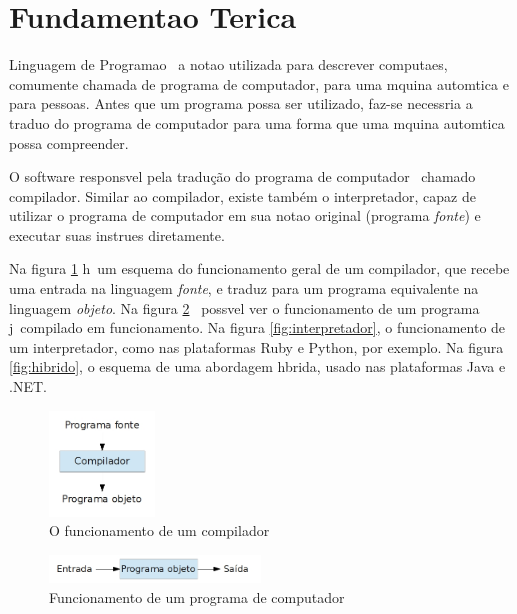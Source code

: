 \section{Fundamenta\ca o Te\oh rica}

\label{pro:fundamentacao}

Linguagem de Programa\ca o \eh\ a nota\ca o utilizada para descrever computa\co es, comumente chamada de programa de computador, para uma m\ah quina autom\ah tica e para pessoas. Antes que um programa possa ser utilizado, faz-se necess\ah ria a tradu\ca o do programa de computador para uma forma que uma m\ah quina autom\ah tica possa compreender.

O software respons\ah vel pela tradução do programa de computador \eh\ chamado compilador. Similar ao compilador, existe também o interpretador, capaz de utilizar o programa de computador em sua nota\ca o original (programa \emph{fonte}) e executar suas instru\co es diretamente.

Na figura \ref{fig:compilador} h\ah\ um esquema do funcionamento geral de um compilador, que recebe uma entrada na linguagem \emph{fonte}, e traduz para um programa equivalente na linguagem \emph{objeto}. Na figura \ref{fig:execucao} \eh\ poss\ih vel ver o funcionamento de um programa j\ah\ compilado em funcionamento. Na figura \ref{fig:interpretador}, o funcionamento de um interpretador, como nas plataformas Ruby e Python, por exemplo. Na figura \ref{fig:hibrido}, o esquema de uma abordagem h\ih brida, usado nas plataformas Java e .NET.

\begin{figure}[htp]
  \begin{center}
    \includegraphics[width=0.25\textwidth]{figuras/compilador}
  \end{center}
  \caption{O funcionamento de um compilador}
  \label{fig:compilador}
\end{figure}

\begin{figure}[htp]
  \begin{center}
    \includegraphics[width=0.5\textwidth]{figuras/execucao}
  \end{center}
  \caption{Funcionamento de um programa de computador}
  \label{fig:execucao}
\end{figure}

